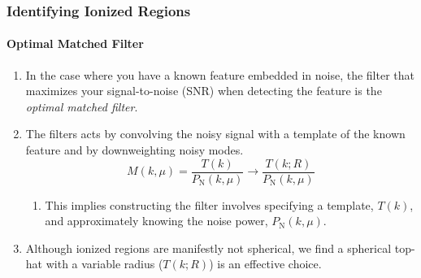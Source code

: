 \documentclass{beamer}
\begin{document}

\begin{frame}
\frametitle{Identifying Ionized Regions}
\framesubtitle{Optimal Matched Filter}
\begin{enumerate}[-]
\item In the case where you have a known feature embedded in noise, the filter that maximizes your signal-to-noise (SNR) when detecting the feature is the \textit{optimal matched filter}.
\item The filters acts by convolving the noisy signal with a template of the known feature and by downweighting noisy modes. 
\begin{equation}
M(k,\mu) = \frac{T(k)}{P_{\text{N}}(k,\mu)} \to \frac{T(k;R)}{P_{\text{N}}(k,\mu)}
\end{equation}
\begin{enumerate}[$\implies$]
\item This implies constructing the filter involves specifying a template, $T(k)$, and approximately knowing the noise power, $P_{\text{N}}(k,\mu)$.
\end{enumerate}
\item Although ionized regions are manifestly not spherical, we find a spherical top-hat with a variable radius ($T(k;R)$) is an effective choice. 
\end{enumerate}
\end{frame}
\end{document}
